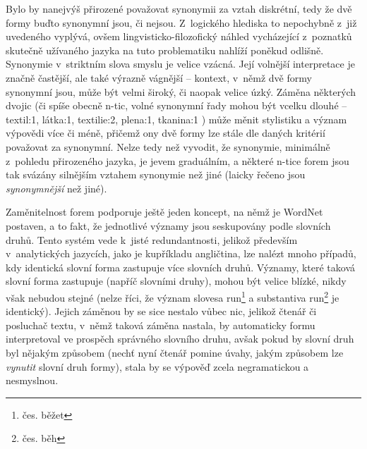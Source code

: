 \documentclass[a4paper,11pt,openany,twoside]{book}
\newcommand\ex{\textsf}
\begin{document}
					Bylo by nanejvýš přirozené považovat synonymii za vztah diskrétní, tedy že dvě formy buďto synonymní jsou, či nejsou. Z~logického hlediska to nepochybně z~již uvedeného vyplývá, ovšem lingvisticko-filozofický náhled vycházející z~poznatků skutečně užívaného jazyka na tuto problematiku nahlíží poněkud odlišně. Synonymie v~striktním slova smyslu je velice vzácná. Její volnější interpretace je značně častější, ale také výrazně vágnější -- kontext, v~němž dvě formy synonymní jsou, může být velmi široký, či naopak velice úzký. Záměna některých dvojic (či spíše obecně n-tic, volné synonymní řady mohou být vcelku dlouhé -- \ex{textil:1, látka:1, textilie:2, plena:1, tkanina:1} \parencite{pala2004building}) může měnit stylistiku a význam výpovědi více či méně, přičemž ony dvě formy lze stále dle daných kritérií považovat za synonymní. Nelze tedy než vyvodit, že synonymie, minimálně z~pohledu přirozeného jazyka, je jevem graduálním, a některé n-tice forem jsou tak svázány silnějším vztahem synonymie než jiné (laicky řečeno jsou \textit{synonymnější} než jiné). \parencite{miller1990introduction}

					Zaměnitelnost forem podporuje ještě jeden koncept, na němž je WordNet postaven, a to fakt, že jednotlivé významy jsou seskupovány podle slovních druhů. Tento systém vede k~jisté redundantnosti, jelikož především v~analytických jazycích, jako je kupříkladu angličtina, lze nalézt mnoho případů, kdy identická slovní forma zastupuje více slovních druhů. Významy, které taková slovní forma zastupuje (napříč slovními druhy), mohou být velice blízké, nikdy však nebudou stejné (nelze říci, že význam slovesa \ex{run}\footnote{čes. \ex{běžet}} a substantiva \ex{run}\footnote{čes. \ex{běh}} je identický). Jejich záměnou by se sice nestalo vůbec nic, jelikož čtenář či posluchač textu, v~němž taková záměna nastala, by automaticky formu interpretoval ve prospěch správného slovního druhu, avšak pokud by slovní druh byl nějakým způsobem  (nechť nyní čtenář pomine úvahy, jakým způsobem lze \textit{vynutit} slovní druh formy), stala by se výpověď zcela negramatickou a nesmyslnou. 
\end{document}
